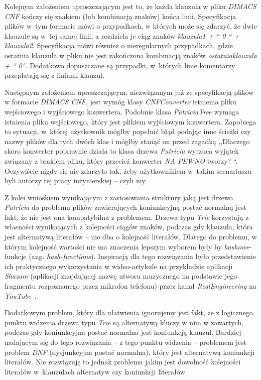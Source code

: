 		Kolejnym założeniem uproszczającym jest to, że każda klauzula w pliku \emph{DIMACS CNF} kończy się znakiem (lub kombinacją znaków) końca linii. Specyfikacja plików w~tym formacie mówi o przypadkach, w których może się zdarzyć, że dwie klauzule są w~tej samej linii, a rozdziela je ciąg znaków \emph{klauzula1 + `` 0 `` + klauzula2}. Specyfikacja mówi również o nieregularnych przypadkach, gdzie ostatnia klauzula w pliku nie jest zakończona kombinacją znaków \emph{ostatnia\textunderscore klauzula + `` 0``}. Dodatkowo dopuszczane są przypadki, w~których linie komentarzy przeplatają się z liniami klauzul.
		
		Następnym założeniem uproszczającym, niezwiązanym już ze specyfikacją plików w formacie \emph{DIMACS CNF}, jest wymóg klasy \emph{CNFConverter} istnienia pliku wejściowego i wyjściowego konwertera. Podobnie klasa \emph{PatriciaTree} wymaga istnienia pliku wejściowego, który jest plikiem wyjściowym konwertera. Zapobiega to sytuacji, w~której użytkownik mógłby popełnić błąd podając inne ścieżki czy nazwy plików dla tych dwóch klas i mógłby stanąć on przed zagadką ,,Dlaczego skoro konwerter poprawnie działa to klasa drzewa \emph{Patricia} wyrzuca wyjątek związany z brakiem pliku, który przecież konwerter \emph{NA PEWNO} tworzy? ``. Oczywiście nigdy się nie zdarzyło tak, żeby użytkownikiem w~takim scenariuszu byli autorzy tej pracy inżynierskiej -- czyli my.
		
		Z kolei wnioskiem wynikającym z zastosowania struktury jaką jest drzewo \emph{Patricia} do problemu plików zawierających koniunkcyjną postać normalną jest fakt, że nie jest ona kompatybilna z problemem. Drzewa typu \emph{Trie} korzystają z własności wynikających z kolejności ciągów znaków, podczas gdy klauzula, która jest alternatywą literałów -- nie dba o kolejność literałów. Dlatego do problemu, w którym kolejność wartości nie ma znaczenia lepszym wyborem były by \emph{hashowe}-funkcje (ang. \emph{hash-functions}). Inspiracją dla tego rozwiązania było przedstawienie ich praktycznego wykorzystania w wideo-artykule na przykładzie aplikacji \emph{Shazam} (aplikacji znajdującej nazwę utworu muzycznego na podstawie jego fragmentu rozpoznanego przez mikrofon telefonu) przez kanał \emph{RealEngineering} na \emph{YouTube}~\cite{HashFunctionsShazamYoutubeRealEngineering}.
		
		Dodatkowym problem, który dla ułatwienia ignorujemy jest fakt, że z logicznego punktu widzenia drzewa typu \emph{Trie} są alternatywą kluczy w nim w zawartych, podczas gdy koniunkcyjna postać normalna jest koniunkcją klauzul. Bardziej nadającym się do tego rozwiązania -- z tego punktu widzenia -- problemem jest problem \emph{DNF} (dysjunkcyjna postać normalna), który jest alternatywą koniunkcji literałów. \newpage Nie rozwiązuję to jednak problemu jakim jest dowolność kolejności literałów w~klauzulach alternatyw czy koniunkcji literałów.
		
